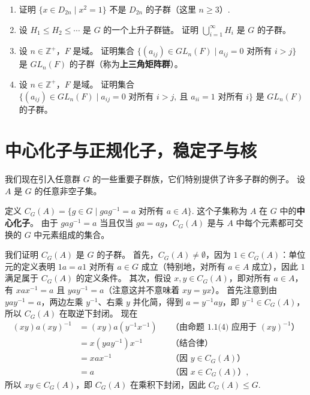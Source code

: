 \begin{enumerate}
\item 证明 \( \{x \in D_{2n} \mid x^2 = 1\} \) 不是 \( D_{2n} \) 的子群（这里 \( n \geq 3 \)）.

\item 设 \( H_1 \leq H_2 \leq \cdots \) 是 \( G \) 的一个上升子群链。
证明 \( \bigcup_{i=1}^{\infty} H_i \) 是 \( G \) 的子群。

\item 设 \( n \in \mathbb{Z}^+ \)，\( F \) 是域。
证明集合
\(
\{(a_{ij}) \in GL_n(F) \mid a_{ij} = 0 \text{ 对所有 } i > j\}
\)
是 \( GL_n(F) \) 的子群（称为\textbf{上三角矩阵群}）。

\item 设 \( n \in \mathbb{Z}^+ \)，\( F \) 是域。
证明集合
\(
\{(a_{ij}) \in GL_n(F) \mid a_{ij} = 0 \text{ 对所有 } i > j,\ \text{且 } a_{ii} = 1 \text{ 对所有 } i\}
\)
是 \( GL_n(F) \) 的子群。
\end{enumerate}


\section{中心化子与正规化子，稳定子与核}

我们现在引入任意群 \( G \) 的一些重要子群族，它们特别提供了许多子群的例子。
设 \( A \) 是 \( G \) 的任意非空子集。

\begin{definition}
定义
\(
C_G(A) = \{ g \in G \mid gag^{-1} = a \text{ 对所有 } a \in A \}.
\)
这个子集称为 \( A \) 在 \( G \) 中的\textbf{中心化子}。
由于 \( gag^{-1} = a \) 当且仅当 \( ga = ag \)，\( C_G(A) \) 是与 \( A \) 中每个元素都可交换的 \( G \) 中元素组成的集合。
\end{definition}

我们证明 \( C_G(A) \) 是 \( G \) 的子群。
首先，\( C_G(A) \neq \emptyset \)，因为 \( 1 \in C_G(A) \)：单位元的定义表明 \( 1a = a1 \) 对所有 \( a \in G \) 成立（特别地，对所有 \( a \in A \) 成立），因此 \( 1 \) 满足属于 \( C_G(A) \) 的定义条件。
其次，假设 \( x, y \in C_G(A) \)，即对所有 \( a \in A \)，有 \( xax^{-1} = a \) 且 \( yay^{-1} = a \)（注意这并不意味着 \( xy = yx \)）。
首先注意到由 \( yay^{-1} = a \)，两边左乘 \( y^{-1} \)、右乘 \( y \) 并化简，得到 \( a = y^{-1}ay \)，即 \( y^{-1} \in C_G(A) \)，所以 \( C_G(A) \) 在取逆下封闭。
现在
\[
\begin{aligned}
(xy)a(xy)^{-1} &= (xy)a(y^{-1}x^{-1}) && \text{（由命题 1.1(4) 应用于 } (xy)^{-1}\text{）} \\
&= x(yay^{-1})x^{-1} && \text{（结合律）} \\
&= xax^{-1} && \text{（因 } y \in C_G(A)\text{）} \\
&= a && \text{（因 } x \in C_G(A)\text{）},
\end{aligned}
\]
所以 \( xy \in C_G(A) \)，即 \( C_G(A) \) 在乘积下封闭，因此 \( C_G(A) \leq G \).

